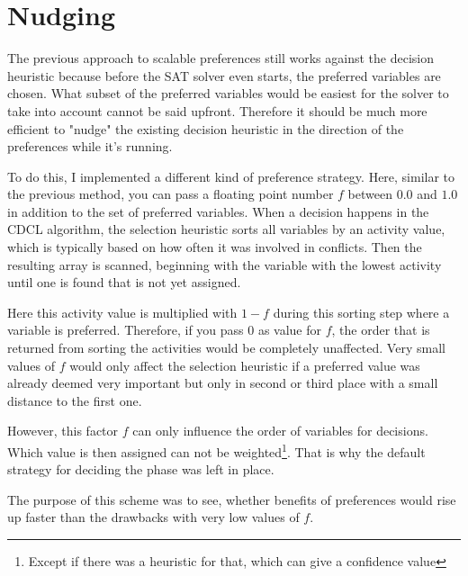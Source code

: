 \section{Nudging}
The previous approach to scalable preferences still works against the decision heuristic because before the SAT solver even starts, the preferred variables are chosen. What subset of the preferred variables would be easiest for the solver to take into account cannot be said upfront. Therefore it should be much more efficient to "nudge" the existing decision heuristic in the direction of the preferences while it's running.

To do this, I implemented a different kind of preference strategy. Here, similar to the previous method, you can pass a floating point number $f$ between $0.0$ and $1.0$ in addition to the set of preferred variables. When a decision happens in the CDCL algorithm, the selection heuristic sorts all variables by an activity value, which is typically based on how often it was involved in conflicts. Then the resulting array is scanned, beginning with the variable with the lowest activity until one is found that is not yet assigned. 

Here this activity value is multiplied with $1-f$ during this sorting step where a variable is preferred. Therefore, if you pass $0$ as value for $f$, the order that is returned from sorting the activities would be completely unaffected. Very small values of $f$ would only affect the selection heuristic if a preferred value was already deemed very important but only in second or third place with a small distance to the first one. 

However, this factor $f$ can only influence the order of variables for decisions. Which value is then assigned can not be weighted\footnote{Except if there was a heuristic for that, which can give a confidence value}. That is why the default strategy for deciding the phase was left in place. 


The purpose of this scheme was to see, whether benefits of preferences would rise up faster than the drawbacks with very low values of $f$.

